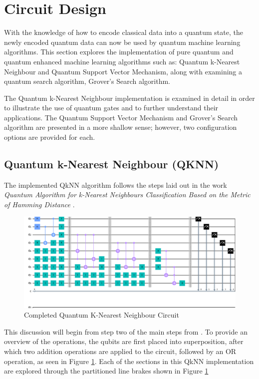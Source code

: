 \section{Circuit Design}

With the knowledge of how to encode classical data into a quantum state, the newly encoded quantum data can now be used by quantum machine learning algorithms. %
 This section explores the implementation of pure quantum and quantum enhanced machine learning algorithms such as: Quantum k-Nearest Neighbour and Quantum Support Vector Mechanism, along with examining a quantum search algorithm, Grover's  Search algorithm.

 The Quantum k-Nearest Neighbour implementation is examined in detail in order to illustrate the use of quantum gates and to further understand their applications. %
  The Quantum Support Vector Mechanism and Grover's Search algorithm are presented in a more shallow sense; however, %
  two configuration options are provided for each.

\subsection{Quantum k-Nearest Neighbour (QKNN)}\label{ImpleQkNN}

The implemented QkNN algorithm follows the steps laid out in the work \emph{Quantum Algorithm for k-Nearest Neighbours Classification Based on the Metric of Hamming Distance} \citep{wiebe2014quantum}.

\begin{figure}[H]
      \centering
      \includegraphics[scale=0.5]{background/FullKNN.png}
      \caption{Completed Quantum K-Nearest Neighbour Circuit}
      \label{FKNN}
\end{figure}
This discussion will begin from step two of the main steps from \cite{Kaye}. To provide an overview of the operations, the qubits are first placed into superposition, after which two addition operations are applied to the circuit, followed by an OR operation, as seen in Figure \ref{FKNN}. Each of the sections in this QkNN implementation are explored through the partitioned line brakes shown in Figure \ref{FKNN} %




